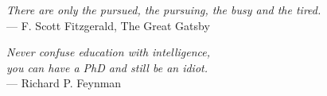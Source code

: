 \begin{frontmatter}
\begin{epigraph}
        \setlength{\parskip}{40pt plus 1pt minus 1pt}
        \emph{There are only the pursued, the pursuing, the busy and the tired.}\\
        --- F. Scott Fitzgerald, The Great Gatsby \par

        \setlength{\parskip}{40pt plus 1pt minus 1pt}
        \emph{Never confuse education with intelligence, \\
            you can have a PhD and still be an idiot.}\\
        --- Richard P. Feynman \par


    \end{epigraph}



    \tableofcontents
    \listoffigures  %
    \listoftables   %



    \begin{acknowledgements}



\end{acknowledgements}
\end{frontmatter}
